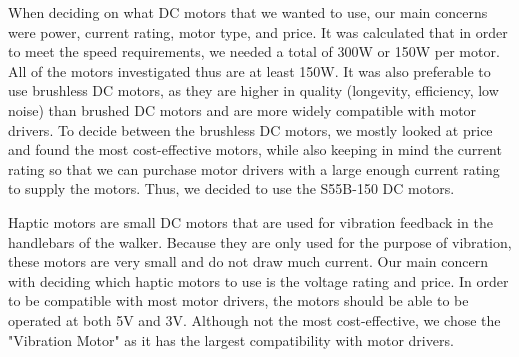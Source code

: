\noindent When deciding on what DC motors that we wanted to use, our main concerns were power, current rating, motor type, and price. It was calculated that in order to meet the speed requirements, we needed a total of 300W or 150W per motor. All of the motors investigated thus are at least 150W. It was also preferable to use brushless DC motors, as they are higher in quality (longevity, efficiency, low noise) than brushed DC motors and are more widely compatible with motor drivers. To decide between the brushless DC motors, we mostly looked at price and found the most cost-effective motors, while also keeping in mind the current rating so that we can purchase motor drivers with a large enough current rating to supply the motors. Thus, we decided to use the S55B-150 DC motors. \cite{yzl1} \cite{Citphto} \cite{AliExpress1} \cite{AliExpress2} \cite{AliExpress3} \cite{PrecisionMicrodrives} \cite {AliExpress8}\\

\begin{table}[H]
	\centering
	\setlength{\tabcolsep}{5pt} %
	\renewcommand{\arraystretch}{1.75} %
	\caption{\label{fig:vibrationMotorSpecifications}Vibration Motor Specifications}
\end{table}

\noindent Haptic motors are small DC motors that are used for vibration feedback in the handlebars of the walker. Because they are only used for the purpose of vibration, these motors are very small and do not draw much current. Our main concern with deciding which haptic motors to use is the voltage rating and price. In order to be compatible with most motor drivers, the motors should be able to be operated at both 5V and 3V. Although not the most cost-effective, we chose the "Vibration Motor" as it has the largest compatibility with motor drivers.\\

